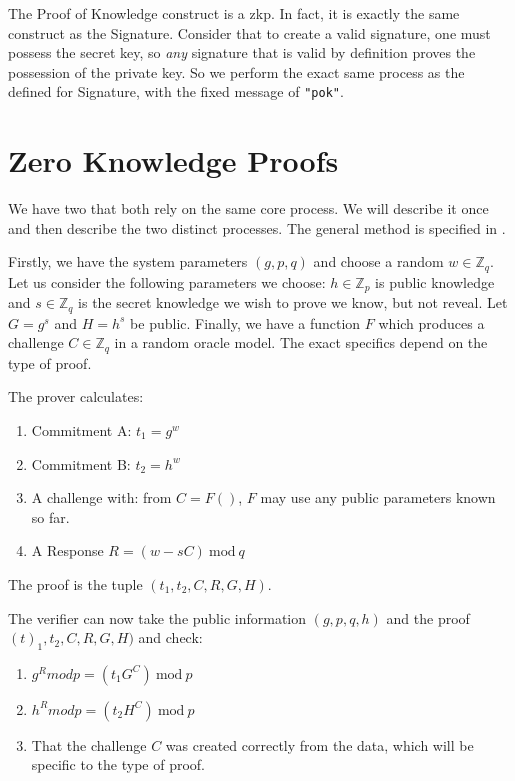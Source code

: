The Proof of Knowledge construct is a \gls{zkp}. In fact, it is exactly the same construct as the Signature. Consider that to create a valid signature, one must possess the secret key, so \emph{any} signature that is valid by definition proves the possession of the private key. So we perform the exact same process as the defined for Signature, with the fixed message of \lstinline[style=ES6]{"pok"}.

\section*{Zero Knowledge Proofs}
\label{proc:zkp}

We have two  that both rely on the same core process. We will describe it once and then describe the two distinct processes. The general method is specified in \cite{camenischProofSystemsGeneral}.

Firstly, we have the system parameters $(g,p,q)$ and choose a random $w \in \mathbb{Z}_q$. Let us consider the following parameters we choose: $h \in \mathbb{Z}_p$ is public knowledge and $s \in \mathbb{Z}_q$ is the secret knowledge we wish to prove we know, but not reveal. Let $G = g^s$ and $H = h^s$ be public. Finally, we have a function $F$ which produces a challenge $C \in \mathbb{Z}_q$ in a random oracle model. The exact specifics depend on the type of proof.

The prover calculates:

\begin{enumerate}
    \item Commitment A: $t_1 = g^w$
    \item Commitment B: $t_2 = h^w$
    \item A challenge with: from $C = F()$, $F$ may use any public parameters known so far.
    \item A Response $R = (w - sC)\ \textrm{mod}\ q$
\end{enumerate}

The proof is the tuple $(t_1, t_2, C, R, G, H)$.

The verifier can now take the public information $(g,p,q,h)$ and the proof $(t)_1, t_2, C, R, G, H)$ and check:

\begin{enumerate}
    \item $g^R mod p = (t_1G^C)\ \textrm{mod}\ p$
    \item $h^R mod p = (t_2H^C)\ \textrm{mod}\ p$
    \item That the challenge $C$ was created correctly from the data, which will be specific to the type of proof.
\end{enumerate}

